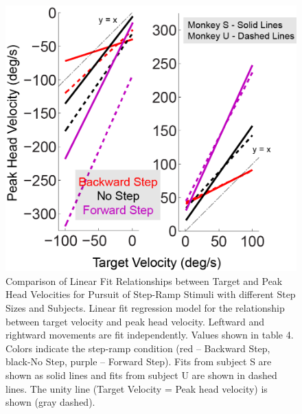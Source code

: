 \documentclass[12pt]{article}
\begin{document}
\begin{figure}
\centering
\includegraphics[width=0.7\linewidth]{./figs/StepRampRegressions}
\caption{Comparison of Linear Fit Relationships between Target and Peak Head Velocities for Pursuit of Step-Ramp Stimuli with different Step Sizes and Subjects. Linear fit regression model for the relationship between target velocity and peak head velocity. Leftward and rightward movements are fit independently. Values shown in table 4. Colors indicate the step-ramp condition (red – Backward Step, black-No Step, purple – Forward Step). Fits from subject S are shown as solid lines and fits from subject U are shown in dashed lines. The unity line (Target Velocity = Peak head velocity) is shown (gray dashed).}
\label{fig:StepRampRegressions}
\end{figure}
\end{document}
